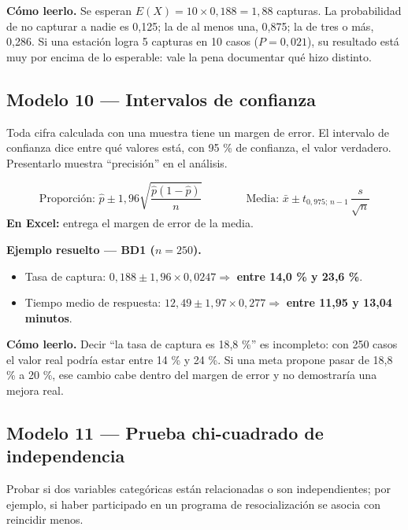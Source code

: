 \textbf{Cómo leerlo.} Se esperan $E(X)=10\times 0{,}188=1{,}88$ capturas. La probabilidad
de no capturar a nadie es 0,125; la de al menos una, 0,875; la de tres o más, 0,286. Si
una estación logra 5 capturas en 10 casos ($P=0{,}021$), su resultado está muy por encima
de lo esperable: vale la pena documentar qué hizo distinto.

\subsection{Modelo 10 --- Intervalos de confianza}

\begin{cajaModelo}
Toda cifra calculada con una muestra tiene un margen de error. El intervalo de confianza
dice entre qué valores está, con 95 \% de confianza, el valor verdadero. Presentarlo
muestra ``precisión'' en el análisis.
\end{cajaModelo}

\[
\text{Proporción: } \hat{p}\pm 1{,}96\sqrt{\frac{\hat{p}(1-\hat{p})}{n}}
\qquad\qquad
\text{Media: } \bar{x}\pm t_{0{,}975;\,n-1}\,\frac{s}{\sqrt{n}}
\]
\textbf{En Excel:}  entrega el margen de error de la media.

\textbf{Ejemplo resuelto --- BD1 ($n=250$).}
\begin{itemize}[leftmargin=1.4em,itemsep=1pt]
\item Tasa de captura: $0{,}188\pm 1{,}96\times 0{,}0247 \Rightarrow$ \textbf{entre 14,0 \% y 23,6 \%}.
\item Tiempo medio de respuesta: $12{,}49\pm 1{,}97\times 0{,}277 \Rightarrow$ \textbf{entre 11,95 y 13,04 minutos}.
\end{itemize}

\textbf{Cómo leerlo.} Decir ``la tasa de captura es 18,8 \%'' es incompleto: con 250 casos
el valor real podría estar entre 14 \% y 24 \%. Si una meta propone pasar de 18,8 \% a
20 \%, ese cambio cabe dentro del margen de error y no demostraría una mejora real.

\subsection{Modelo 11 --- Prueba chi-cuadrado de independencia}

\begin{cajaModelo}
Probar si dos variables categóricas están relacionadas o son independientes; por
ejemplo, si haber participado en un programa de resocialización se asocia con reincidir
menos.
\end{cajaModelo}

